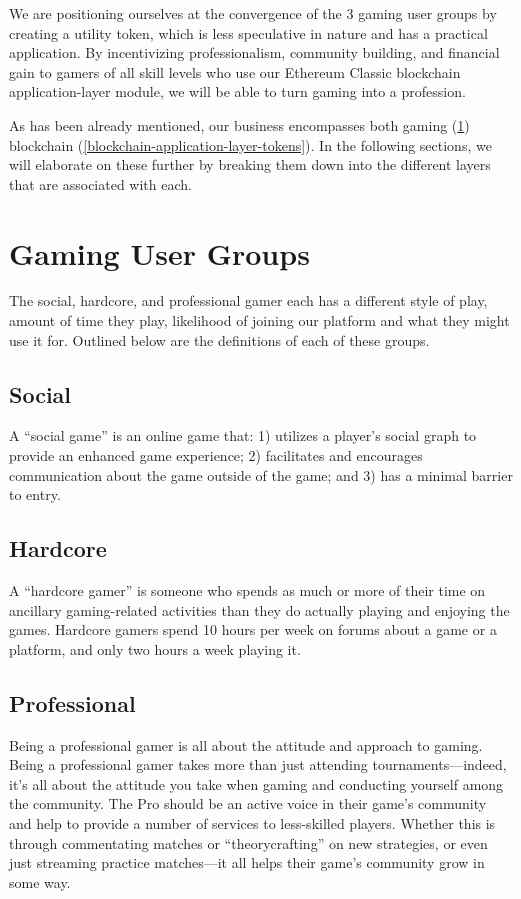 \documentclass[11pt]{report}
\begin{document}
We are positioning ourselves at the convergence of the 3 gaming user groups by creating a utility token, which is less speculative in nature and has a practical application. By incentivizing professionalism, community building, and financial gain to gamers of all skill levels who use our Ethereum Classic blockchain application-layer module, we will be able to turn gaming into a profession.

As has been already mentioned, our business encompasses both gaming (\ref{gaming-industry}) blockchain (\ref{blockchain-application-layer-tokens}). In the following sections, we will elaborate on these further by breaking them down into the different layers that are associated with each.
\section{Gaming User Groups}\label{gaming-industry}
The social, hardcore, and professional gamer each has a different style of play, amount of time they play, likelihood of joining our platform and what they might use it for. Outlined below are the definitions of each of these groups.
\subsection{Social}\label{social-gamer}
A ``social game'' is an online game that: 1) utilizes a player's social graph to provide an enhanced game experience; 2) facilitates and encourages communication about the game outside of the game; and 3) has a minimal barrier to entry.\cite{social-game}
\subsection{Hardcore}\label{hardcore-gamer}
A ``hardcore gamer'' is someone who spends as much or more of their time on ancillary gaming-related activities than they do actually playing and enjoying the games. Hardcore gamers spend 10 hours per week on forums about a game or a platform, and only two hours a week playing it. \cite{hardcore-gamer}
\subsection{Professional}\label{professional-gamer}
Being a professional gamer is all about the attitude and approach to gaming. Being a professional gamer takes more than just attending tournaments---indeed, it’s all about the attitude you take when gaming and conducting yourself among the community. The Pro should be an active voice in their game’s community and help to provide a number of services to less-skilled players. Whether this is through commentating matches or ``theorycrafting'' on new strategies, or even just streaming practice matches---it all helps their game’s community grow in some way.\cite{professional-gamer}
\end{document}
